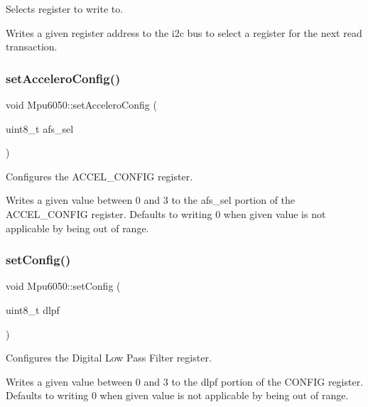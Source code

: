 Selects register to write to. 

Writes a given register address to the i2c bus to select a register for the next read transaction. \mbox{\label{classMpu6050_a3cfca1ea37e1d1bc4aebba7ceedb5a28}} 
\subsubsection{\texorpdfstring{set\+Accelero\+Config()}{setAcceleroConfig()}}
{\footnotesize\ttfamily void Mpu6050\+::set\+Accelero\+Config (\begin{DoxyParamCaption}\item[{uint8\+\_\+t}]{afs\+\_\+sel }\end{DoxyParamCaption})\hspace{0.3cm}{\ttfamily [virtual]}}



Configures the A\+C\+C\+E\+L\+\_\+\+C\+O\+N\+F\+IG register. 

Writes a given value between 0 and 3 to the afs\+\_\+sel portion of the A\+C\+C\+E\+L\+\_\+\+C\+O\+N\+F\+IG register. Defaults to writing 0 when given value is not applicable by being out of range. \mbox{\label{classMpu6050_a39dc9a11251acf10c9c3b24e84ec8a57}} 
\subsubsection{\texorpdfstring{set\+Config()}{setConfig()}}
{\footnotesize\ttfamily void Mpu6050\+::set\+Config (\begin{DoxyParamCaption}\item[{uint8\+\_\+t}]{dlpf }\end{DoxyParamCaption})\hspace{0.3cm}{\ttfamily [virtual]}}



Configures the Digital Low Pass Filter register. 

Writes a given value between 0 and 3 to the dlpf portion of the C\+O\+N\+F\+IG register. Defaults to writing 0 when given value is not applicable by being out of range. \mbox{\label{classMpu6050_aef89bc30955f1db83eed1bb0dc9ec175}} 
